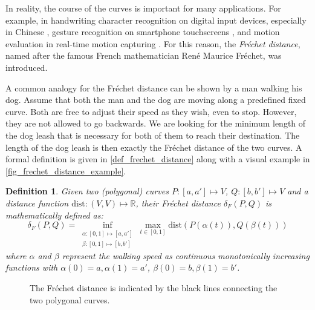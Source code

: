 \documentclass[
oneside,
fontsize=11pt
]{scrartcl}
\newtheorem{mydef}{Definition}
\begin{document}
In reality, the course of the curves is important for many applications. 
For example, in handwriting character recognition on digital input devices, especially in Chinese \cite{chanin_david_hanzi_nodate},
gesture recognition on smartphone touchscreens \cite{hu_research_2022}, %
and motion evaluation in real-time motion capturing \cite{qiao_real-time_2017, shehu_curve_2012}. %
For this reason, the \textit{Fréchet distance}, named after the famous French mathematician René Maurice Fréchet, was introduced.

A common analogy for the Fréchet distance can be shown by a man walking his dog. 
Assume that both the man and the dog are moving along a predefined fixed curve. 
Both are free to adjust their speed as they wish, even to stop. 
However, they are not allowed to go backwards. 
We are looking for the minimum length of the dog leash 
that is necessary for both of them to reach their destination. 
The length of the dog leash is then exactly the Fréchet distance of the two curves.
A formal definition is given in \autoref{def_frechet_distance} 
along with a visual example in \autoref{fig_frechet_distance_example}.

\begin{mydef}
  \label{def_frechet_distance}
  Given two (polygonal) curves $P: [a,a'] \mapsto V$, $Q: [b,b'] \mapsto V$ and a distance function $\text{dist}: (V,V) \mapsto \mathbb{R}$, 
  their Fréchet distance $\delta_{F}(P,Q)$ is mathematically defined as: 
  $$\delta_{F}(P,Q) = \inf_{\substack{\alpha: [0,1] \mapsto [a, a'] \\ \beta: [0,1] \mapsto [b, b']}} \max_{t \in [0,1]} \text{dist}(P(\alpha(t)), Q(\beta(t)))$$
  where $\alpha$ and $\beta$ represent the walking speed as 
  continuous monotonically increasing functions with
  $\alpha(0) = a, \alpha(1) = a'$, 
  $\beta(0) =b, \beta(1) =b'$.
\end{mydef}

\begin{figure}[ht]
  \centering
  
  \caption{The Fréchet distance is indicated by the black lines connecting the two polygonal curves.}
  \label{fig_frechet_distance_example}
\end{figure}
\end{document}
